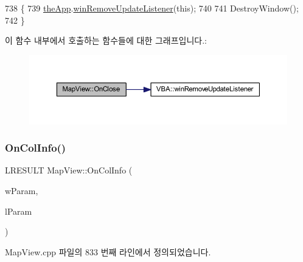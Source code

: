 \begin{DoxyCode}
738 \{
739   \mbox{\hyperlink{_v_b_a_8cpp_a8095a9d06b37a7efe3723f3218ad8fb3}{theApp}}.\mbox{\hyperlink{class_v_b_a_a2d31a0656df2230310aa8dc9e3a735d3}{winRemoveUpdateListener}}(\textcolor{keyword}{this});
740   
741   DestroyWindow();
742 \}
\end{DoxyCode}
이 함수 내부에서 호출하는 함수들에 대한 그래프입니다.\+:
\nopagebreak
\begin{figure}[H]
\begin{center}
\leavevmode
\includegraphics[width=350pt]{class_map_view_a4831981d7411a8a37353679421517cf8_cgraph}
\end{center}
\end{figure}
\mbox{\label{class_map_view_ae6fd15cfd77671946d4ad08f901bde3c}} 
\subsubsection{\texorpdfstring{On\+Col\+Info()}{OnColInfo()}}
{\footnotesize\ttfamily L\+R\+E\+S\+U\+LT Map\+View\+::\+On\+Col\+Info (\begin{DoxyParamCaption}\item[{W\+P\+A\+R\+AM}]{w\+Param,  }\item[{L\+P\+A\+R\+AM}]{l\+Param }\end{DoxyParamCaption})}



Map\+View.\+cpp 파일의 833 번째 라인에서 정의되었습니다.



